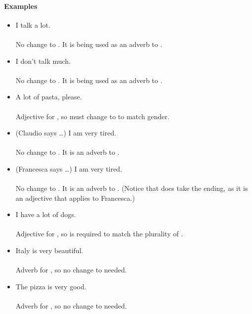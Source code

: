 \paragraph{Examples}
\begin{itemize}
    \item I talk a lot. \\
     \\
    No change to . It is being used as an adverb to .

    \item I don't talk much. \\
     \\
    No change to . It is being used as an adverb to .

    \item A lot of pasta, please. \\
     \\
    Adjective for , so  must change to  to match gender.
    
    \item (Claudio says \ldots) I am very tired. \\
     \\
    No change to . It is an adverb to .

    \item (Francesca says \ldots) I am very tired. \\
     \\
    No change to . It is an adverb to . (Notice that  does 
		take the  ending, as it is an adjective that applies to Francesca.)

    \item I have a lot of dogs. \\
     \\
    Adjective for , so  is required to match the plurality of .
    
    \item Italy is very beautiful. \\
     \\
    Adverb for , so no change to  needed.
    
    \item The pizza is very good. \\
     \\
    Adverb for , so no change to  needed.

\end{itemize}

